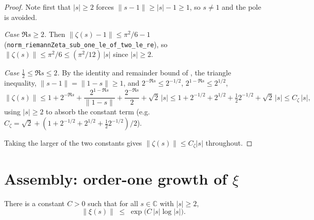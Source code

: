 \begin{proof}
\leanok
{}
Note first that $|s|\ge2$ forces $\|s-1\|\ge|s|-1\ge1$, so $s\neq1$ and the pole is
avoided.

\emph{Case $\Re s\ge2$.} Then $\|\zeta(s)-1\|\le\pi^2/6-1$
(\texttt{norm\_riemannZeta\_sub\_one\_le\_of\_two\_le\_re}), so
$\|\zeta(s)\|\le\pi^2/6\le(\pi^2/12)\,|s|$ since $|s|\ge2$.

\emph{Case $\tfrac12\le\Re s\le2$.} By the identity and remainder bound of
, the triangle inequality, $\|s-1\|=\|1-s\|\ge1$, and
$2^{-\Re s}\le2^{-1/2}$, $2^{1-\Re s}\le2^{1/2}$,
\[
  \|\zeta(s)\|\le 1+2^{-\Re s}+\frac{2^{1-\Re s}}{\|1-s\|}+\frac{2^{-\Re s}}2+\sqrt2\,|s|
   \le 1+2^{-1/2}+2^{1/2}+\tfrac12 2^{-1/2}+\sqrt2\,|s|
   \le C_\zeta\,|s|,
\]
using $|s|\ge2$ to absorb the constant term (e.g.\
$C_\zeta=\sqrt2+(1+2^{-1/2}+2^{1/2}+\tfrac12 2^{-1/2})/2$).

Taking the larger of the two constants gives $\|\zeta(s)\|\le C_\zeta|s|$ throughout.
\end{proof}

\section{Assembly: order-one growth of \texorpdfstring{$\xi$}{xi}}
\label{sec:xo_main}

\begin{theorem}
\label{thm:xo_order}
\leanok
{}
There is a constant $C>0$ such that for all $s\in\mathbb C$ with $|s|\ge2$,
\[
  \|\xi(s)\|\;\le\;\exp\!\bigl(C\,|s|\log|s|\bigr).
\]
\end{theorem}

